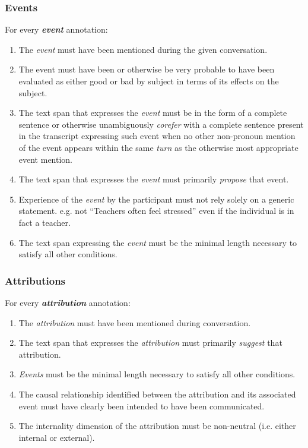 \documentclass[a4paper,12pt]{article}
\begin{document}
    \subsubsection{Events}
    For every \textbf{\emph{event}} annotation:
        \begin{enumerate}
            \item The \emph{event} must have been mentioned during the given conversation.
            \item The event must have been or otherwise be very probable to have been evaluated as either good or bad by subject in terms of its effects on the subject.
            \item The text span that expresses the \emph{event} must be in the form of a complete sentence or otherwise unambiguously \emph{corefer} with a complete sentence present in the transcript expressing such event when no other non-pronoun mention of the event appears within the same \emph{turn} as the otherwise most appropriate event mention.
            \item The text span that expresses the \emph{event} must primarily \emph{propose} that event. %
            \item Experience of the \emph{event} by the participant must not rely solely on a generic statement.
                e.g. not ``Teachers often feel stressed'' even if the individual is in fact a teacher.
            \item The text span expressing the \emph{event} must be the minimal length necessary to satisfy all other conditions.
        \end{enumerate}


    \subsubsection{Attributions}
    For every \textbf{\emph{attribution}} annotation:
        \begin{enumerate}
            \item The \emph{attribution} must have been mentioned during conversation.
            \item The text span that expresses the \emph{attribution} must primarily \emph{suggest} that attribution. %
            \item \emph{Events} must be the minimal length necessary to satisfy all other conditions.
            \item The causal relationship identified between the attribution and its associated event must have clearly been intended to have been communicated.
            \item The internality dimension of the attribution must be non-neutral (i.e. either internal or external).
        \end{enumerate}
\end{document}
